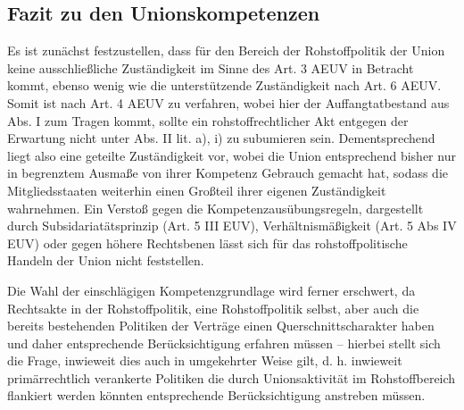 \documentclass[12pt,a4paper,oneside]{book} %
\begin{document}
	\subsection{Fazit zu den Unionskompetenzen}
	Es ist zunächst festzustellen, dass für den Bereich der Rohstoffpolitik der Union keine ausschließliche Zuständigkeit im Sinne des Art. 3 AEUV in Betracht kommt, ebenso wenig wie die unterstützende Zuständigkeit nach Art. 6 AEUV. Somit ist nach Art. 4 AEUV zu verfahren, wobei hier der Auffangtatbestand aus Abs. I zum Tragen kommt, sollte ein rohstoffrechtlicher Akt entgegen der Erwartung nicht unter Abs. II lit. a), i) zu subumieren sein. Dementsprechend liegt also eine geteilte Zuständigkeit vor, wobei die Union entsprechend bisher nur in begrenztem Ausmaße von ihrer Kompetenz Gebrauch gemacht hat, sodass die Mitgliedsstaaten weiterhin einen Großteil ihrer eigenen Zuständigkeit wahrnehmen. Ein Verstoß gegen die Kompetenzausübungsregeln, dargestellt durch Subsidariatätsprinzip (Art. 5 III EUV), Verhältnismäßigkeit (Art. 5 Abs IV EUV) oder gegen höhere Rechtsbenen lässt sich für das rohstoffpolitische Handeln der Union nicht feststellen.
	
	Die Wahl der einschlägigen Kompetenzgrundlage wird ferner erschwert, da Rechtsakte in der Rohstoffpolitik, eine Rohstoffpolitik selbst, aber auch die bereits bestehenden Politiken der Verträge einen Querschnittscharakter haben und daher entsprechende Berücksichtigung erfahren müssen -- hierbei stellt sich die Frage, inwieweit dies auch in umgekehrter Weise gilt, d. h. inwieweit primärrechtlich verankerte Politiken die durch Unionsaktivität im Rohstoffbereich flankiert werden könnten entsprechende Berücksichtigung anstreben müssen.
	
	
\end{document}
